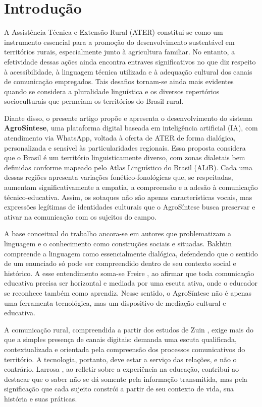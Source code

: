  \chapter{Introdução} %

\begin{flushleft}
	A Assistência Técnica e Extensão Rural (ATER) constitui-se como um instrumento essencial para a promoção do desenvolvimento sustentável em territórios rurais, especialmente junto à agricultura familiar. No entanto, a efetividade dessas ações ainda encontra entraves significativos no que diz respeito à acessibilidade, à linguagem técnica utilizada e à adequação cultural dos canais de comunicação empregados. Tais desafios tornam-se ainda mais evidentes quando se considera a pluralidade linguística e os diversos repertórios socioculturais que permeiam os territórios do Brasil rural.
	
	Diante disso, o presente artigo propõe e apresenta o desenvolvimento do sistema \textbf{AgroSíntese}, uma plataforma digital baseada em inteligência artificial (IA), com atendimento via WhatsApp, voltada à oferta de ATER de forma dialógica, personalizada e sensível às particularidades regionais. Essa proposta considera que o Brasil é um território linguisticamente diverso, com zonas dialetais bem definidas conforme mapeado pelo Atlas Linguístico do Brasil (ALiB). Cada uma dessas regiões apresenta variações fonético-fonológicas que, se respeitadas, aumentam significativamente a empatia, a compreensão e a adesão à comunicação técnico-educativa. Assim, os sotaques não são apenas características vocais, mas expressões legítimas de identidades culturais que o AgroSíntese busca preservar e ativar na comunicação com os sujeitos do campo.

	
	A base conceitual do trabalho ancora-se em autores que problematizam a linguagem e o conhecimento como construções sociais e situadas. Bakhtin \cite{bakhtin1997estetica} compreende a linguagem como essencialmente dialógica, defendendo que o sentido de um enunciado só pode ser compreendido dentro de seu contexto social e histórico. A esse entendimento soma-se Freire \cite{freire2013extensao}, ao afirmar que toda comunicação educativa precisa ser horizontal e mediada por uma escuta ativa, onde o educador se reconhece também como aprendiz. Nesse sentido, o AgroSíntese não é apenas uma ferramenta tecnológica, mas um dispositivo de mediação cultural e educativa.
	
	A comunicação rural, compreendida a partir dos estudos de Zuin \cite{zuin2021comunicacao}, exige mais do que a simples presença de canais digitais: demanda uma escuta qualificada, contextualizada e orientada pela compreensão dos processos comunicativos do território. A tecnologia, portanto, deve estar a serviço das relações, e não o contrário. Larrosa \cite{larrosa2014}, ao refletir sobre a experiência na educação, contribui ao destacar que o saber não se dá somente pela informação transmitida, mas pela significação que cada sujeito constrói a partir de seu contexto de vida, sua história e suas práticas.
	

\end{flushleft}
